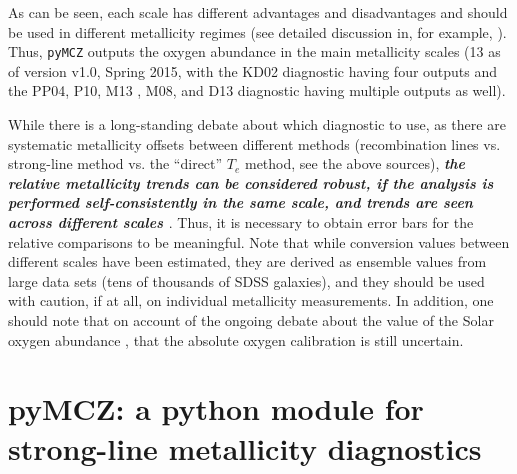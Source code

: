 \documentclass{emulateapj}
\begin{document}
As can be seen, each scale has different advantages and disadvantages and should be used in different metallicity regimes (see detailed discussion in, for example,  \citealt{kewley02,stasinska02,kewley08,moustakas10,lopezsanchez12,dopita13,blanc15}). Thus, \verb=pyMCZ= outputs the oxygen abundance in the main metallicity scales (13 as of version v1.0, Spring 2015, with the KD02 diagnostic having four outputs and the PP04, P10, M13 , M08, and D13 diagnostic having multiple outputs as well).

While there is a long-standing debate about which diagnostic to use, as there are systematic metallicity offsets between different methods (recombination lines vs. strong-line method vs. the ``direct'' $T_e$ method, see the above sources), \emph{\bf the relative metallicity trends can be considered robust, if the analysis is performed self-consistently in the same scale, and trends are seen across different scales \citep{kewley08,moustakas10}}. Thus, it is necessary to obtain error bars for the relative comparisons to be meaningful. Note that while conversion values between different scales \citep{kewley08} have been estimated, they are derived as ensemble values from large data sets (tens of thousands of SDSS galaxies), and they should be used with caution, if at all, on individual metallicity measurements.
In addition, one should note that on account of the ongoing debate about the value of the Solar oxygen abundance \citep{asplund09_rev,chaffau11}, that the absolute oxygen calibration is still uncertain.






\section{pyMCZ: a python module for strong-line metallicity diagnostics}\label{method_sec}
\end{document}
